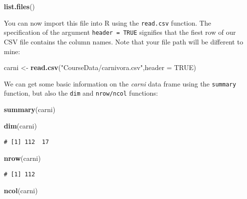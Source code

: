 \documentclass[
  a4paperpaper,
]{book}
\newenvironment{Shaded}{\begin{snugshade}}{\end{snugshade}}
\newcommand{\DataTypeTok}[1]{\textcolor[rgb]{0.13,0.29,0.53}{#1}}
\newcommand{\KeywordTok}[1]{\textcolor[rgb]{0.13,0.29,0.53}{\textbf{#1}}}
\newcommand{\NormalTok}[1]{#1}
\newcommand{\OtherTok}[1]{\textcolor[rgb]{0.56,0.35,0.01}{#1}}
\newcommand{\StringTok}[1]{\textcolor[rgb]{0.31,0.60,0.02}{#1}}
\begin{document}
\begin{Shaded}
\begin{Highlighting}[]
\KeywordTok{list.files}\NormalTok{()}
\end{Highlighting}
\end{Shaded}

You can now import this file into R using the \texttt{read.csv} function. The specification of the argument \texttt{header\ =\ TRUE} signifies that the fiest row of our CSV file contains the column names. Note that your file path will be different to mine:

\begin{Shaded}
\begin{Highlighting}[]
\NormalTok{carni \textless{}{-}}\StringTok{ }\KeywordTok{read.csv}\NormalTok{(}\StringTok{"CourseData/carnivora.csv"}\NormalTok{,}\DataTypeTok{header =} \OtherTok{TRUE}\NormalTok{)}
\end{Highlighting}
\end{Shaded}

We can get some basic information on the \emph{carni} data frame using the \texttt{summary} function, but also the \texttt{dim} and \texttt{nrow/ncol} functions:

\begin{Shaded}
\begin{Highlighting}[]
\KeywordTok{summary}\NormalTok{(carni)}
\end{Highlighting}
\end{Shaded}

\begin{Shaded}
\begin{Highlighting}[]
\KeywordTok{dim}\NormalTok{(carni)}
\end{Highlighting}
\end{Shaded}

\begin{verbatim}
# [1] 112  17
\end{verbatim}

\begin{Shaded}
\begin{Highlighting}[]
\KeywordTok{nrow}\NormalTok{(carni)}
\end{Highlighting}
\end{Shaded}

\begin{verbatim}
# [1] 112
\end{verbatim}

\begin{Shaded}
\begin{Highlighting}[]
\KeywordTok{ncol}\NormalTok{(carni)}
\end{Highlighting}
\end{Shaded}
\end{document}
